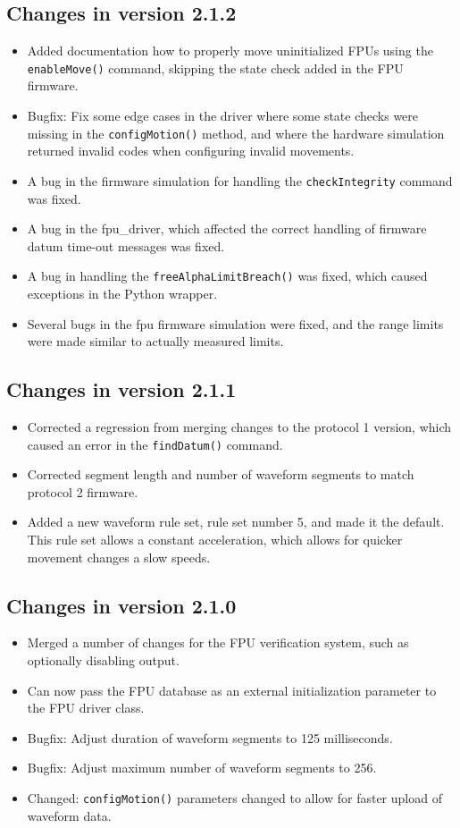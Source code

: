 \documentclass[fontsize=12,a4paper]{scrreprt}
\begin{document}
\subsection*{Changes in version 2.1.2}
\begin{itemize}
\item Added documentation how to properly move uninitialized FPUs
  using the \texttt{enableMove()} command, skipping the state check
  added in the FPU firmware.
\item Bugfix: Fix some edge cases in the driver where some state
  checks were missing in the \texttt{configMotion()} method, and where
  the hardware simulation returned invalid codes when configuring
  invalid movements.
\item A bug in the firmware simulation for handling the
  \texttt{checkIntegrity} command was fixed.
\item A bug in the fpu\_driver, which affected the correct handling of
  firmware datum time-out messages was fixed.
\item A bug in handling the \texttt{freeAlphaLimitBreach()} was
  fixed, which caused exceptions in the Python wrapper.
\item Several bugs in the fpu firmware simulation were fixed, and the
  range limits were made similar to actually measured limits.
\end{itemize}

\subsection*{Changes in version 2.1.1}
\begin{itemize}
\item Corrected a regression from merging changes to the protocol 1
  version, which caused an error in the \texttt{findDatum()} command.
\item Corrected segment length and number of waveform segments
  to match protocol 2 firmware.
\item Added a new waveform rule set, rule set number 5, and made it
  the default. This rule set allows a constant acceleration, which
  allows for quicker movement changes a slow speeds.
\end{itemize}


\subsection*{Changes in version 2.1.0}
\begin{itemize}
\item Merged a number of changes for the FPU verification system,
  such as optionally disabling output.
\item Can now pass the FPU database as an external initialization
  parameter to the FPU driver class.
\item Bugfix: Adjust duration of waveform segments to 125 milliseconds.
\item Bugfix: Adjust maximum number of waveform segments to 256.
\item Changed: \texttt{configMotion()} parameters changed to allow for
  faster upload of waveform data.
\end{itemize}
\end{document}
